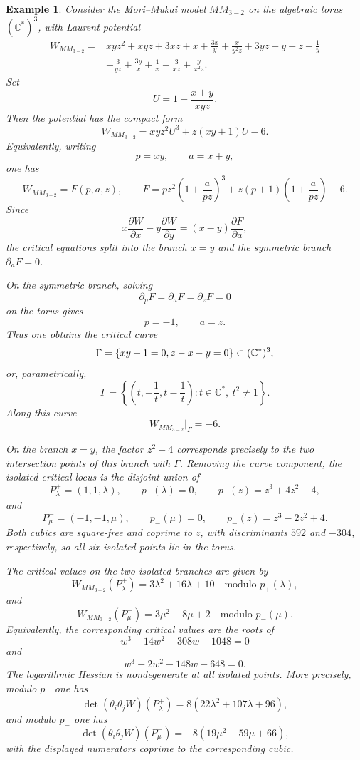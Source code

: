 \documentclass[11pt]{amsart}
\newtheorem{example}{Example}[section]
\begin{document}
\begin{example}
Consider the Mori--Mukai model $MM_{3-2}$ on the algebraic torus
$(\mathbb{C}^*)^3$, with Laurent potential
\begin{align*}
W_{MM_{3-2}}={}&xy z^2+xy z+3xz+x+\frac{3x}{y}+\frac{x}{y^2z}
+3yz+y+z+\frac{1}{y} \\
&+\frac{3}{yz}+\frac{3y}{x}+\frac{1}{x}+\frac{3}{xz}
+\frac{y}{x^2z}.
\end{align*}
Set
\[
U=1+\frac{x+y}{xyz}.
\]
Then the potential has the compact form
\[
W_{MM_{3-2}}=xy z^2U^3+z(xy+1)U-6.
\]
Equivalently, writing
\[
p=xy,
\qquad
a=x+y,
\]
one has
\[
W_{MM_{3-2}}=F(p,a,z),
\qquad
F=pz^2\left(1+\frac{a}{pz}\right)^3
+z(p+1)\left(1+\frac{a}{pz}\right)-6.
\]
Since
\[
x\frac{\partial W}{\partial x}-y\frac{\partial W}{\partial y}
=(x-y)\frac{\partial F}{\partial a},
\]
the critical equations split into the branch $x=y$ and the symmetric branch
$\partial_aF=0$.

On the symmetric branch, solving
\[
\partial_pF=\partial_aF=\partial_zF=0
\]
on the torus gives
\[
p=-1,
\qquad
a=z.
\]
Thus one obtains the critical curve
\[
\Gamma=\{xy+1=0,\\ z-x-y=0\}
\subset(\mathbb{C}^*)^3,
\]
or, parametrically,
\[
\Gamma=\left\{\left(t,-\frac{1}{t},t-\frac{1}{t}\right):
t\in\mathbb{C}^*,\ t^2\neq1\right\}.
\]
Along this curve
\[
W_{MM_{3-2}}|_{\Gamma}=-6.
\]

On the branch $x=y$, the factor $z^2+4$ corresponds precisely to the two
intersection points of this branch with $\Gamma$. Removing the curve component,
the isolated critical locus is the disjoint union of
\[
P^+_{\lambda}=(1,1,\lambda),
\qquad
p_+(\lambda)=0,
\qquad
p_+(z)=z^3+4z^2-4,
\]
and
\[
P^-_{\mu}=(-1,-1,\mu),
\qquad
p_-(\mu)=0,
\qquad
p_-(z)=z^3-2z^2+4.
\]
Both cubics are square-free and coprime to $z$, with discriminants $592$ and
$-304$, respectively, so all six isolated points lie in the torus.

The critical values on the two isolated branches are given by
\[
W_{MM_{3-2}}(P^+_{\lambda})=3\lambda^2+16\lambda+10
\quad\text{modulo }p_+(\lambda),
\]
and
\[
W_{MM_{3-2}}(P^-_{\mu})=3\mu^2-8\mu+2
\quad\text{modulo }p_-(\mu).
\]
Equivalently, the corresponding critical values are the roots of
\[
w^3-14w^2-308w-1048=0
\]
and
\[
w^3-2w^2-148w-648=0.
\]
The logarithmic Hessian is nondegenerate at all isolated points. More
precisely, modulo $p_+$ one has
\[
\det(\theta_i\theta_jW)(P^+_{\lambda})
=8(22\lambda^2+107\lambda+96),
\]
and modulo $p_-$ one has
\[
\det(\theta_i\theta_jW)(P^-_{\mu})
=-8(19\mu^2-59\mu+66),
\]
with the displayed numerators coprime to the corresponding cubic.


\end{example}
\end{document}
